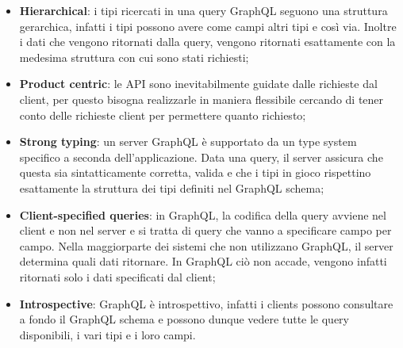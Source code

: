 \begin{itemize}
  \item \textbf{Hierarchical}: i tipi ricercati in una query GraphQL seguono una struttura gerarchica, infatti i tipi possono avere come campi altri tipi e così via. Inoltre i dati che vengono ritornati dalla query, vengono ritornati esattamente con la medesima struttura con cui sono stati richiesti;
  \item \textbf{Product centric}: le API sono inevitabilmente guidate dalle richieste dal client, per questo bisogna realizzarle in maniera flessibile cercando di tener conto delle richieste client per permettere quanto richiesto;
  \item \textbf{Strong typing}: un server GraphQL è supportato da un type system specifico a seconda dell'applicazione. Data una query, il server assicura che questa sia sintatticamente corretta, valida e che i tipi in gioco rispettino esattamente la struttura dei tipi definiti nel GraphQL schema;
  \item \textbf{Client-specified queries}: in GraphQL, la codifica della query avviene nel client e non nel server e si tratta di query che vanno a specificare campo per campo. Nella maggiorparte dei sistemi che non utilizzano GraphQL, il server determina quali dati ritornare. In GraphQL ciò non accade, vengono infatti ritornati solo i dati specificati dal client;
  \item \textbf{Introspective}: GraphQL è introspettivo, infatti i clients possono consultare a fondo il GraphQL schema e possono dunque vedere tutte le query disponibili, i vari tipi e i loro campi.
\end{itemize}
